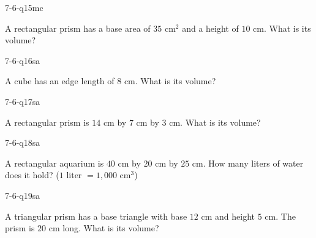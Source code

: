 \begin{practiceQuestion}{7-6-q15}{mc}
\begin{questionText}
A rectangular prism has a base area of $35$ cm$^2$ and a height of $10$ cm. What is its volume?
\end{questionText}
\end{practiceQuestion}


\begin{practiceQuestion}{7-6-q16}{sa}
\begin{questionText}
A cube has an edge length of $8$ cm. What is its volume?
\end{questionText}
\end{practiceQuestion}

\begin{practiceQuestion}{7-6-q17}{sa}
\begin{questionText}
A rectangular prism is $14$ cm by $7$ cm by $3$ cm. What is its volume?
\end{questionText}
\end{practiceQuestion}

\begin{practiceQuestion}{7-6-q18}{sa}
\begin{questionText}
A rectangular aquarium is $40$ cm by $20$ cm by $25$ cm. How many liters of water does it hold? ($1$ liter $= 1{,}000$ cm$^3$)
\end{questionText}
\end{practiceQuestion}

\begin{practiceQuestion}{7-6-q19}{sa}
\begin{questionText}
A triangular prism has a base triangle with base $12$ cm and height $5$ cm. The prism is $20$ cm long. What is its volume?
\end{questionText}
\end{practiceQuestion}

